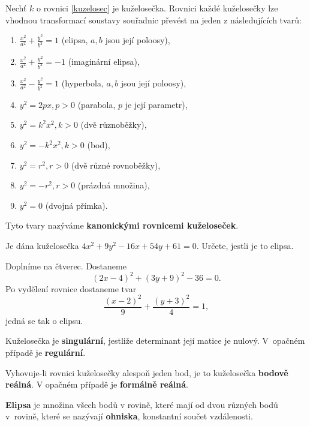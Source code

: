 \begin{definition}
    Nechť $k$ o rovnici \ref{kuzelosec} je kuželosečka. Rovnici každé kuželosečky lze
    vhodnou transformací soustavy souřadnic převést na jeden z následujících tvarů:
    \begin{enumerate}[$i.$]
    \item $\frac{x^2}{a^2} + \frac{y^2}{b^2}=1$ (elipsa, $a,b$ jsou její poloosy),
   	\item $\frac{x^2}{a^2} + \frac{y^2}{b^2}=-1$ (imaginární elipsa),
   	\item $\frac{x^2}{a^2} - \frac{y^2}{b^2}=1$ (hyperbola, $a,b$ jsou její poloosy),
   	\item $y^2=2px, p>0$ (parabola, $p$ je její parametr),
   	\item $y^2 = k^2x^2, k>0$ (dvě různoběžky),
   	\item $y^2 = -k^2x^2, k>0$ (bod),
   	\item $y^2 = r^2, r>0$ (dvě různé rovnoběžky),
   	\item $y^2 = -r^2, r>0$ (prázdná množina),
   	\item $y^2=0$ (dvojná přímka).
    \end{enumerate}
   Tyto tvary nazýváme \textbf{kanonickými rovnicemi kuželoseček}.
\end{definition}

\begin{priklad}
Je dána kuželosečka $4x^2+9y^2-16x+54y+61=0.$ Určete, jestli je to elipsa.
\end{priklad}

\begin{reseni}
Doplníme na čtverec. Dostaneme
$$
    (2x-4)^2 + (3y+9)^2 - 36 = 0.
$$
Po vydělení rovnice dostaneme tvar
$$
\frac{(x-2)^2}{9} + \frac{(y+3)^2}{4} = 1,
$$
jedná se tak o elipsu.
\end{reseni}

\begin{definition}
    Kuželosečka je \textbf{singulární}, jestliže determinant její matice je nulový.
    V~opačném případě je \textbf{regulární}.
\end{definition}

\begin{definition}
    Vyhovuje-li rovnici kuželosečky alespoň jeden bod, je to kuželosečka
    \textbf{bodově reálná}. V opačném případě je \textbf{formálně reálná}.
\end{definition}

\begin{definition}
\textbf{Elipsa} je množina všech bodů v rovině, které mají od dvou různých bodů v~rovině,
které se nazývají \textbf{ohniska}, konstantní součet vzdálenosti.
\end{definition}

